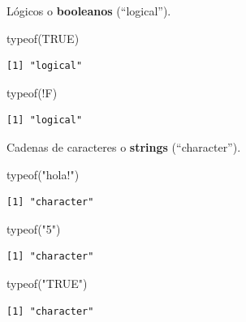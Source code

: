 \documentclass[
  letterpaper,
  DIV=11,
  numbers=noendperiod]{scrartcl}
\newenvironment{Shaded}{\begin{snugshade}}{\end{snugshade}}
\newcommand{\ConstantTok}[1]{\textcolor[rgb]{0.56,0.35,0.01}{#1}}
\newcommand{\FunctionTok}[1]{\textcolor[rgb]{0.28,0.35,0.67}{#1}}
\newcommand{\NormalTok}[1]{\textcolor[rgb]{0.00,0.23,0.31}{#1}}
\newcommand{\SpecialCharTok}[1]{\textcolor[rgb]{0.37,0.37,0.37}{#1}}
\newcommand{\StringTok}[1]{\textcolor[rgb]{0.13,0.47,0.30}{#1}}
\begin{document}
Lógicos o \textbf{booleanos} (``logical'').

\begin{Shaded}
\begin{Highlighting}[]
\FunctionTok{typeof}\NormalTok{(}\ConstantTok{TRUE}\NormalTok{) }
\end{Highlighting}
\end{Shaded}

\begin{verbatim}
[1] "logical"
\end{verbatim}

\begin{Shaded}
\begin{Highlighting}[]
\FunctionTok{typeof}\NormalTok{(}\SpecialCharTok{!}\NormalTok{F)}
\end{Highlighting}
\end{Shaded}

\begin{verbatim}
[1] "logical"
\end{verbatim}

Cadenas de caracteres o \textbf{strings} (``character'').

\begin{Shaded}
\begin{Highlighting}[]
\FunctionTok{typeof}\NormalTok{(}\StringTok{"hola!"}\NormalTok{) }
\end{Highlighting}
\end{Shaded}

\begin{verbatim}
[1] "character"
\end{verbatim}

\begin{Shaded}
\begin{Highlighting}[]
\FunctionTok{typeof}\NormalTok{(}\StringTok{"5"}\NormalTok{) }
\end{Highlighting}
\end{Shaded}

\begin{verbatim}
[1] "character"
\end{verbatim}

\begin{Shaded}
\begin{Highlighting}[]
\FunctionTok{typeof}\NormalTok{(}\StringTok{"TRUE"}\NormalTok{) }
\end{Highlighting}
\end{Shaded}

\begin{verbatim}
[1] "character"
\end{verbatim}
\end{document}
